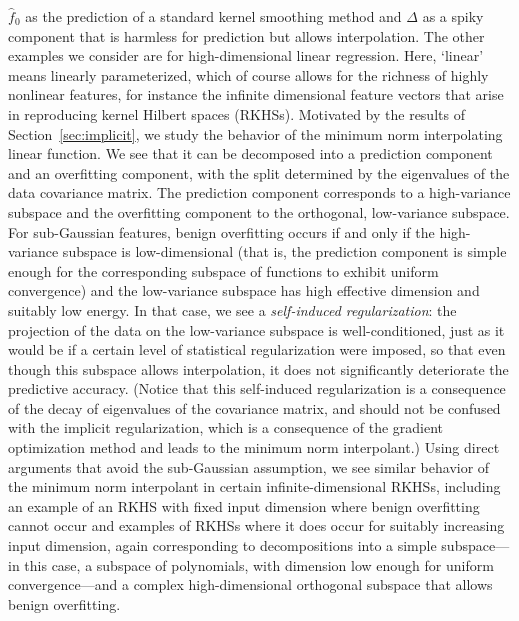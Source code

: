 $\widehat f_0$ as the prediction of a standard kernel smoothing method and $\Delta$ as a spiky component that is harmless for prediction but allows interpolation.  The other examples we consider are for high-dimensional linear regression. Here, `linear' means linearly parameterized, which of course allows for the richness of highly nonlinear features, for instance the infinite dimensional feature vectors that arise in reproducing kernel Hilbert spaces (RKHSs). Motivated by the results of Section~\ref{sec:implicit}, we study the behavior of the minimum norm interpolating linear function. We see that it can be decomposed into a prediction component and an overfitting component, with the split determined by the eigenvalues of the data covariance matrix. The prediction component corresponds to a high-variance subspace and the overfitting component to the orthogonal, low-variance subspace.  For sub-Gaussian features, benign overfitting occurs if and only if the high-variance subspace is low-dimensional (that is, the prediction component is simple enough for the corresponding subspace of functions to exhibit uniform convergence) and the low-variance subspace has high effective dimension and suitably low energy. In that case, we see a {\em self-induced regularization}: the projection of the data on the low-variance subspace is well-conditioned, just as it would be if a certain level of statistical regularization were imposed, so that even though this subspace allows interpolation, it does not significantly deteriorate the predictive accuracy. (Notice that this self-induced regularization is a consequence of the decay of eigenvalues of the covariance matrix, and should not be confused with the implicit regularization, which is a consequence of the gradient optimization method and leads to the minimum norm interpolant.)  Using direct arguments that avoid the sub-Gaussian assumption, we see similar behavior of the minimum norm interpolant in certain infinite-dimensional RKHSs, including an example of an RKHS with fixed input dimension where benign overfitting cannot occur and examples of RKHSs where it does occur for suitably increasing input dimension, again corresponding to decompositions into a simple subspace---in this case, a subspace of polynomials, with dimension low enough for uniform convergence---and a complex high-dimensional orthogonal subspace that allows benign overfitting.

